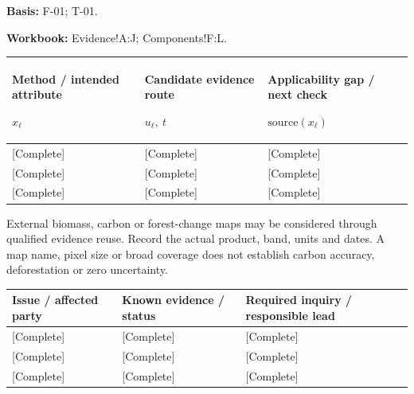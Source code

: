 \textbf{Basis:} F-01; T-01.\par
\textbf{Workbook:} Evidence!A:J; Components!F:L.\par\endgroup
{\sffamily\fontsize{8.3}{10.3}\selectfont\begin{longtable}{@{}P{56.09mm} P{49.49mm} P{59.39mm}@{}}
\toprule
\textbf{Method / intended attribute}\par {\normalfont\fontsize{8.2}{10}\selectfont $x_{\ell}$} & \textbf{Candidate evidence route}\par {\normalfont\fontsize{8.2}{10}\selectfont $u_{\ell},\ t$} & \textbf{Applicability gap / next check}\par {\normalfont\fontsize{8.2}{10}\selectfont $\text{source}(x_{\ell})$}\\\midrule\endhead
\rule{0pt}{7.7mm}[Complete] & [Complete] & [Complete]\\\hline
\rule{0pt}{7.7mm}[Complete] & [Complete] & [Complete]\\\hline
\rule{0pt}{7.7mm}[Complete] & [Complete] & [Complete]\\\hline
\end{longtable}}
\begin{Notice}External biomass, carbon or forest-change maps may be considered through qualified evidence reuse. Record the actual product, band, units and dates. A map name, pixel size or broad coverage does not establish carbon accuracy, deforestation or zero uncertainty.\end{Notice}
{\sffamily\fontsize{8.3}{10.3}\selectfont\begin{longtable}{@{}P{56.09mm} P{51.14mm} P{57.74mm}@{}}
\toprule
\textbf{Issue / affected party} & \textbf{Known evidence / status} & \textbf{Required inquiry / responsible lead}\\\midrule\endhead
\rule{0pt}{7.7mm}[Complete] & [Complete] & [Complete]\\\hline
\rule{0pt}{7.7mm}[Complete] & [Complete] & [Complete]\\\hline
\rule{0pt}{7.7mm}[Complete] & [Complete] & [Complete]\\\hline
\end{longtable}}
